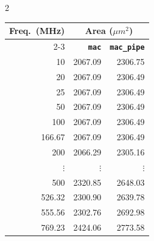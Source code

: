 \documentclass[a4paper,11pt]{article}
\begin{document}
\begin{figure}[htbp]
    \centering

    \begin{multicols}{2}

        \centering
        
        \label{fig:pipe_area}

        \columnbreak

        \centering
        \begin{tabular}{rrr}
            \toprule
            \textbf{Freq.\ (MHz)} &
            \multicolumn{2}{c}{\textbf{Area ($\mu m^2$)}} \\
            \cmidrule(lr){2-3}
            & \textbf{\texttt{mac}} & \textbf{\texttt{mac\_pipe}} \\
            \midrule
            10     & 2067.09 & 2306.75 \\
            20     & 2067.09 & 2306.49 \\
            25     & 2067.09 & 2306.49 \\
            50     & 2067.09 & 2306.49 \\
            100    & 2067.09 & 2306.49 \\
            166.67 & 2067.09 & 2306.49 \\
            200    & 2066.29 & 2305.16 \\
            $\vdots$ & $\vdots$ & $\vdots$ \\
            500    & 2320.85 & 2648.03 \\
            526.32 & 2300.90 & 2639.78 \\
            555.56 & 2302.76 & 2692.98 \\
            769.23 & 2424.06 & 2773.58 \\
            \bottomrule
        \end{tabular}
    \end{multicols}
\end{figure}




\end{document}
